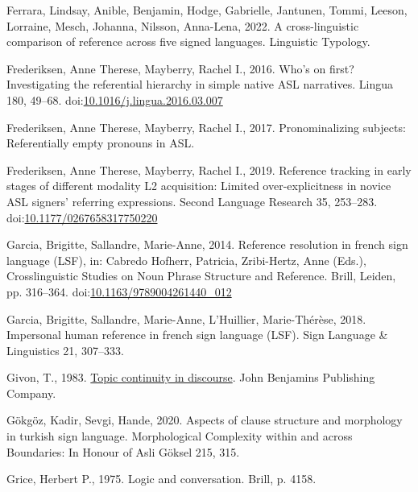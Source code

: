 \documentclass[]{elsarticle} %
\newlength{\cslhangindent}
\newenvironment{CSLReferences}[2] %
 {%
  \setlength{\parindent}{0pt}
  \ifodd #1 \everypar{\setlength{\hangindent}{\cslhangindent}}\ignorespaces\fi
  \ifnum #2 > 0
  \setlength{\parskip}{#2\baselineskip}
  \fi
 }%
 {}
\begin{document}
\begin{CSLReferences}{1}{0}
\leavevmode{}%
Ferrara, Lindsay, Anible, Benjamin, Hodge, Gabrielle, Jantunen, Tommi,
Leeson, Lorraine, Mesch, Johanna, Nilsson, Anna-Lena, 2022. A
cross-linguistic comparison of reference across five signed languages.
Linguistic Typology.

\leavevmode{}%
Frederiksen, Anne Therese, Mayberry, Rachel I., 2016. Who's on first?
Investigating the referential hierarchy in simple native ASL narratives.
Lingua 180, 49--68.
doi:\href{https://doi.org/10.1016/j.lingua.2016.03.007}{10.1016/j.lingua.2016.03.007}

\leavevmode{}%
Frederiksen, Anne Therese, Mayberry, Rachel I., 2017. Pronominalizing
subjects: Referentially empty pronouns in ASL.

\leavevmode{}%
Frederiksen, Anne Therese, Mayberry, Rachel I., 2019. Reference tracking
in early stages of different modality L2 acquisition: Limited
over-explicitness in novice ASL signers{'} referring expressions. Second
Language Research 35, 253--283.
doi:\href{https://doi.org/10.1177/0267658317750220}{10.1177/0267658317750220}

\leavevmode{}%
Garcia, Brigitte, Sallandre, Marie-Anne, 2014. Reference resolution in
french sign language ({LSF}), in: Cabredo Hofherr, Patricia,
Zribi-Hertz, Anne (Eds.), Crosslinguistic Studies on Noun Phrase
Structure and Reference. Brill, Leiden, pp. 316--364.
doi:\href{https://doi.org/10.1163/9789004261440_012}{10.1163/9789004261440\_012}

\leavevmode{}%
Garcia, Brigitte, Sallandre, Marie-Anne, L'Huillier, Marie-Thérèse,
2018. Impersonal human reference in french sign language (LSF). Sign
Language \& Linguistics 21, 307--333.

\leavevmode{}%
Givon, T., 1983. \href{https://benjamins.com/catalog/tsl.3}{Topic
continuity in discourse}. John Benjamins Publishing Company.

\leavevmode{}%
Gökgöz, Kadir, Sevgi, Hande, 2020. Aspects of clause structure and
morphology in turkish sign language. Morphological Complexity within and
across Boundaries: In Honour of Asli Göksel 215, 315.

\leavevmode{}%
Grice, Herbert P., 1975. Logic and conversation. Brill, p. 4158.


\end{CSLReferences}
\end{document}
